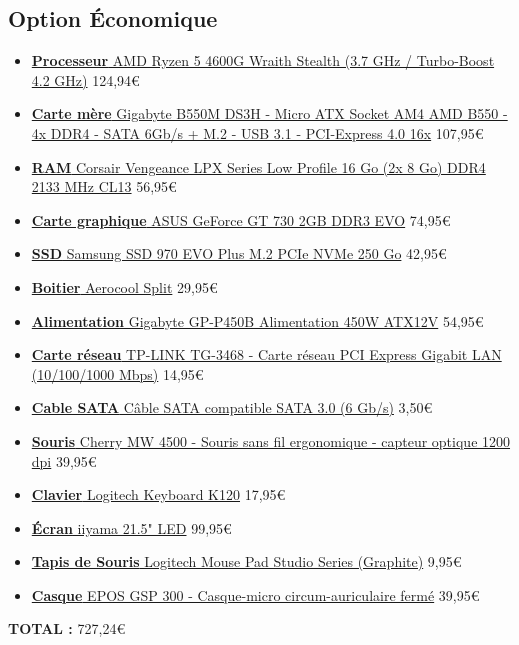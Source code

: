 \subsection{Option Économique}
{
\begin{itemize}
	\item \href{https://www.ldlc.com/fiche/PB00497963.html}{\textbf{Processeur} AMD Ryzen 5 4600G Wraith Stealth (3.7 GHz / Turbo-Boost 4.2 GHz)} 124,94\euro
	\item \href{https://www.ldlc.com/fiche/PB00345955.html}{\textbf{Carte mère} Gigabyte B550M DS3H - Micro ATX Socket AM4 AMD B550 - 4x DDR4 - SATA 6Gb/s + M.2 - USB 3.1 - PCI-Express 4.0 16x} 107,95\euro
	\item \href{https://www.ldlc.com/fiche/PB00191544.html}{\textbf{RAM} Corsair Vengeance LPX Series Low Profile 16 Go (2x 8 Go) DDR4 2133 MHz CL13} 56,95\euro
	\item \href{https://www.ldlc.com/fiche/PB00543736.html}{\textbf{Carte graphique} ASUS GeForce GT 730 2GB DDR3 EVO} 74,95\euro
	\item \href{https://www.ldlc.com/fiche/PB00265389.html}{\textbf{SSD} Samsung SSD 970 EVO Plus M.2 PCIe NVMe 250 Go} 42,95\euro
	\item \href{https://www.ldlc.com/fiche/PB00278344.html}{\textbf{Boitier} Aerocool Split} 29,95\euro
	\item \href{https://www.ldlc.com/fiche/PB00401724.html}{\textbf{Alimentation} Gigabyte GP-P450B Alimentation 450W ATX12V} 54,95\euro
	\item \href{https://www.ldlc.com/fiche/PB00103034.html}{\textbf{Carte réseau} TP-LINK TG-3468 - Carte réseau PCI Express Gigabit LAN (10/100/1000 Mbps)} 14,95\euro
	\item \href{https://www.ldlc.com/fiche/PB00016236.html}{\textbf{Cable SATA} Câble SATA compatible SATA 3.0 (6 Gb/s)} 3,50\euro
	\item \href{https://www.ldlc.com/fiche/PB00243882.html}{\textbf{Souris} Cherry MW 4500 - Souris sans fil ergonomique - capteur optique 1200 dpi} 39,95\euro
	\item \href{https://www.ldlc.com/fiche/PB00103723.html}{\textbf{Clavier} Logitech Keyboard K120} 17,95\euro
	\item \href{https://www.ldlc.com/fiche/PB00543634.html}{\textbf{Écran} iiyama 21.5" LED} 99,95\euro
	\item \href{https://www.ldlc.com/fiche/PB00466685.html}{\textbf{Tapis de Souris} Logitech Mouse Pad Studio Series (Graphite)} 9,95\euro
	\item \href{https://www.ldlc.com/fiche/PB00351651.html}{\textbf{Casque} EPOS GSP 300 - Casque-micro circum-auriculaire fermé} 39,95\euro
\end{itemize}
\vspace{5px}
\textbf{TOTAL :} 727,24\euro

}
